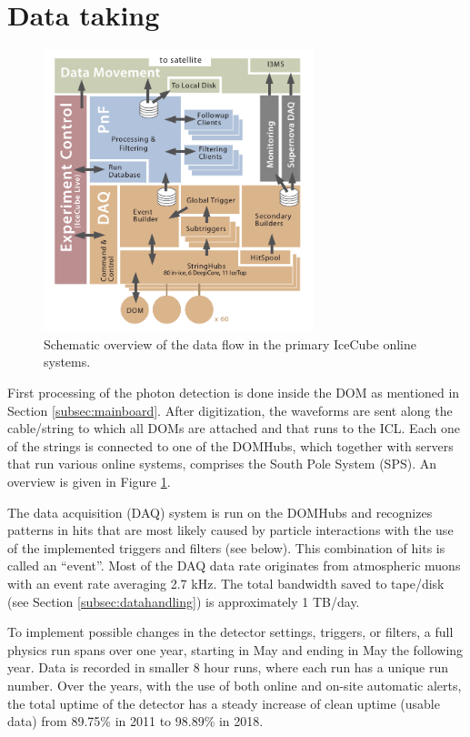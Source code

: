 \section{Data taking}
\label{sec:datataking}

\begin{figure}[t]
\centering
\includegraphics[width=0.7\textwidth]{chapter5/img/dataflow.png}
\caption{Schematic overview of the data flow in the primary IceCube online systems.}
\label{fig:dataflow}
\end{figure}
First processing of the photon detection is done inside the DOM as mentioned in Section \ref{subsec:mainboard}. After digitization, the waveforms are sent along the cable/string to which all DOMs are attached and that runs to the ICL. Each one of the strings is connected to one of the DOMHubs, which together with servers that run various online systems, comprises the South Pole System (SPS). An overview is given in Figure \ref{fig:dataflow}.

The data acquisition (DAQ) system is run on the DOMHubs and recognizes patterns in hits that are most likely caused by particle interactions with the use of the implemented triggers and filters (see below). This combination of hits is called an ``event''. Most of the DAQ data rate originates from atmospheric muons with an event rate averaging 2.7 kHz. The total bandwidth saved to tape/disk (see Section \ref{subsec:datahandling}) is approximately 1 TB/day.

To implement possible changes in the detector settings, triggers, or filters, a full physics run spans over one year, starting in May and ending in May the following year. Data is recorded in smaller 8 hour runs, where each run has a unique run number. Over the years, with the use of both online and on-site automatic alerts, the total uptime of the detector has a steady increase of clean uptime (usable data) from 89.75\% in 2011 to 98.89\% in 2018.

